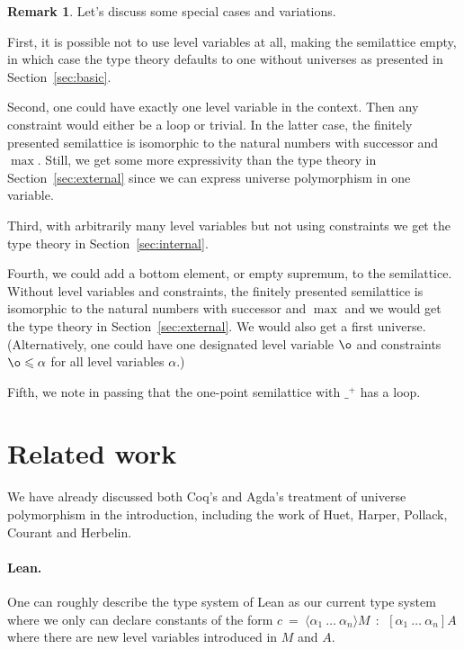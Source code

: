 \documentclass[11pt,a4paper]{article}
\theoremstyle{definition}
\newtheorem{remark}{Remark}
\newcommand{\lam}[1]{{\langle}#1{\rangle}}
\begin{document}


\begin{remark}
Let's discuss some special cases and variations.

First, it is possible not to use
level variables at all, making the semilattice empty,
in which case the type theory defaults to one without universes
as presented in Section~\ref{sec:basic}.

Second, one could have exactly one level variable in the context.
Then any constraint would either be a loop or trivial.
In the latter case, the finitely presented semilattice
is isomorphic to the natural numbers with successor and $\max$.
Still, we get some more
expressivity than the type theory in Section~\ref{sec:external} since
we can express universe polymorphism in one variable.

Third, with arbitrarily many level variables but not using constraints
we get the type theory in Section~\ref{sec:internal}.

Fourth, we could add a bottom element, or empty supremum, to the semilattice.
Without level variables and constraints, the finitely presented semilattice
is isomorphic to the natural numbers with successor and $\max$
and we would get the type theory in Section~\ref{sec:external}.
We would also get a first universe.
(Alternatively, one could have one designated level variable
$\o$ and constraints $\o\leqslant\alpha$
for all level variables $\alpha$.)

Fifth, we note in passing that the one-point semilattice
with $\_^+$ has a loop.
\end{remark}

\section{Related work}\label{sec:related}

We have already discussed both Coq's and Agda's treatment of universe polymorphism in the introduction, including the work of Huet, Harper, Pollack, Courant and Herbelin.

\paragraph{Lean.}

One can roughly describe the type system of Lean \cite{moura:lean,Carneiro19} as our current type system
where we only can declare constants of the form
$c~=~\lam{\alpha_1~\dots~\alpha_n}M~~:~~[\alpha_1~\dots~\alpha_n]A$ where there are new level variables introduced in $M$ and
$A$.
\end{document}

